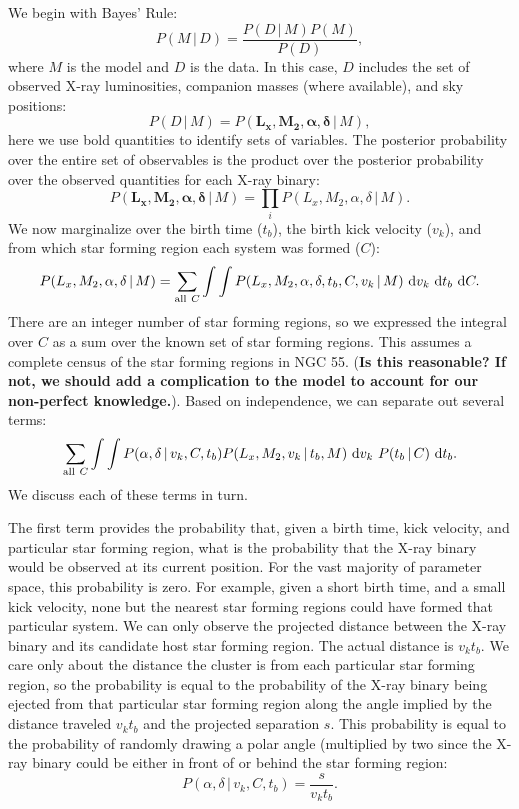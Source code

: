 \documentclass[12pt, preprint]{aastex}
\newcommand{\given}{\,|\,}
\newcommand{\dd}{\mathrm{d}}
\newcommand{\bs}[1]{\boldsymbol{#1}}
\begin{document}
We begin with Bayes' Rule:
\begin{equation}
P( M \given D ) = \frac{P( D \given M ) P(M)}{P(D)},
\end{equation}
where $M$ is the model and $D$ is the data. In this case, $D$ includes the set of observed X-ray luminosities, companion masses (where available), and sky positions:
\begin{equation}
P ( D \given M ) = P( \bs{L_x}, \bs{M_2}, \bs{\alpha}, \bs{\delta} \given M),
\end{equation}
here we use bold quantities to identify sets of variables. The posterior probability over the entire set of observables is the product over the posterior probability over the observed quantities for each X-ray binary:
\begin{equation}
P( \bs{L_x}, \bs{M_2}, \bs{\alpha}, \bs{\delta} \given M) = \prod_i P( L_x, M_2, \alpha, \delta \given M).
\end{equation}
We now marginalize over the birth time ($t_b$), the birth kick velocity ($v_k$), and from which star forming region each system was formed ($C$):
\begin{equation}
P( L_x, M_2, \alpha, \delta \given M) = \sum_{{\rm all}\ C} \int \int P( L_x, M_2, \alpha, \delta, t_b, C, v_k \given M)\ \dd v_k\ \dd t_b\ \dd C.
\end{equation}
There are an integer number of star forming regions, so we expressed the integral over $C$ as a sum over the known set of star forming regions. This assumes a complete census of the star forming regions in NGC 55. ({\bf Is this reasonable? If not, we should add a complication to the model to account for our non-perfect knowledge.}). Based on independence, we can separate out several terms:
\begin{equation}
\sum_{{\rm all}\ C} \int \int P(\alpha, \delta \given v_k, C, t_b) P(L_x, M_2, v_k \given t_b, M)\ \dd v_k\ P(t_b \given C)\ \dd t_b.
\end{equation}
We discuss each of these terms in turn. 

The first term provides the probability that, given a birth time, kick velocity, and particular star forming region, what is the probability that the X-ray binary would be observed at its current position. For the vast majority of parameter space, this probability is zero. For example, given a short birth time, and a small kick velocity, none but the nearest star forming regions could have formed that particular system. We can only observe the projected distance between the X-ray binary and its candidate host star forming region. The actual distance is $v_k t_b$. We care only about the distance the cluster is from each particular star forming region, so the probability is equal to the probability of the X-ray binary being ejected from that particular star forming region along the angle implied by the distance traveled $v_k t_b$ and the projected separation $s$. This probability is equal to the probability of randomly drawing a polar angle (multiplied by two since the X-ray binary could be either in front of or behind the star forming region:
\begin{equation}
P(\alpha, \delta \given v_k, C, t_b) = \frac{s}{v_k t_b}.
\end{equation}
\end{document}
